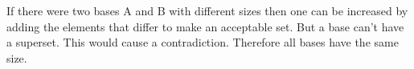 \documentclass{article}
\begin{document}
	If there were two bases A and B with different sizes then one can be increased by adding the elements that differ to make an acceptable set. But a base can't have a superset. This would cause a contradiction. Therefore all bases have the same size.
\end{document}
